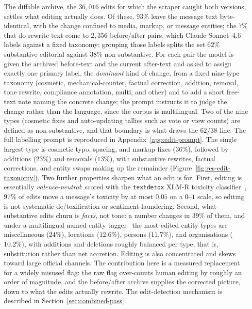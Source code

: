 The diffable archive, the $36{,}016$ edits for which the scraper caught both versions, settles what editing actually does. Of these, $93\%$ leave the message text byte-identical, with the change confined to media, markup, or message entities; the $7\%$ that do rewrite text come to $2{,}356$ before/after pairs, which Claude Sonnet~4.6~\cite{claudesonnet2026} labels against a fixed taxonomy; grouping those labels splits the set $62\%$ substantive editorial against $38\%$ non-substantive. For each pair the model is given the archived before-text and the current after-text and asked to assign exactly one primary label, the \emph{dominant} kind of change, from a fixed nine-type taxonomy (cosmetic, mechanical-counter, factual correction, addition, removal, tone rewrite, compliance annotation, multi, and other) and to add a short free-text note naming the concrete change; the prompt instructs it to judge the change rather than the language, since the corpus is multilingual. Two of the nine types (cosmetic fixes and auto-updating tallies such as vote or view counts) are defined as non-substantive, and that boundary is what draws the $62/38$ line. The full labelling prompt is reproduced in Appendix~\ref{app:edit-prompt}. The single largest type is cosmetic typo, spacing, and markup fixes ($36\%$), followed by additions ($23\%$) and removals ($13\%$), with substantive rewrites, factual corrections, and entity swaps making up the remainder (Figure~\ref{fig:res-edit-taxonomy}). Two further properties sharpen what an edit is for. First, editing is essentially \emph{valence-neutral}: scored with the \texttt{textdetox} XLM-R toxicity classifier~\cite{dementieva2024}, $97\%$ of edits move a message's toxicity by at most $0.05$ on a $0$--$1$ scale, so editing is not systematic de/toxification or sentiment-laundering. Second, what substantive edits churn is \emph{facts}, not tone: a number changes in $39\%$ of them, and under a multilingual named-entity tagger~\cite{tedeschi2021} the most-edited entity types are miscellaneous ($24\%$), locations ($12.6\%$), persons ($11.7\%$), and organisations ($10.2\%$), with additions and deletions roughly balanced per type, that is, substitution rather than net accretion. Editing is also concentrated and skews toward large official channels. The contribution here is a measured replacement for a widely misused flag: the raw flag over-counts human editing by roughly an order of magnitude, and the before/after archive supplies the corrected picture, down to what the edits actually rewrite. The edit-detection mechanism is described in Section~\ref{sec:combined-pass}.

